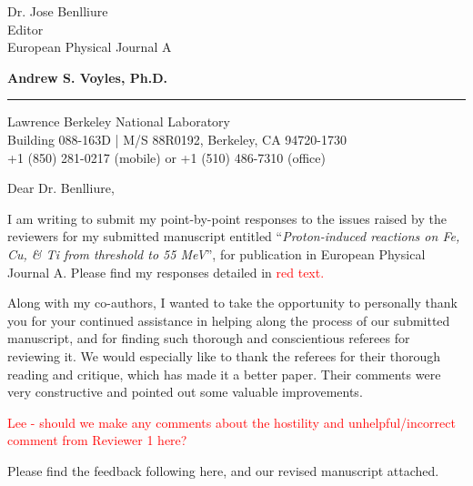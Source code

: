 \documentclass{letter} %
\newcommand{\colornote}[1]{\textcolor{red}{#1}}
\begin{document}
\signature{Andrew S. Voyles}           %
\longindentation=0pt                       %
\let\raggedleft\raggedright                %
\date{13 May, 2020}

 
 
\begin{letter}{Dr. Jose Benlliure \\
Editor \\
European Physical Journal A}


\begin{flushleft}
{\large\bf Andrew S. Voyles, Ph.D.}
\end{flushleft}
\medskip\hrule height 1pt
\begin{flushright}
\hfill Lawrence Berkeley National Laboratory \\
\hfill Building 088-163D  |  M/S 88R0192, Berkeley, CA  94720-1730 \\
\hfill  +1 (850) 281-0217 (mobile) or +1 (510) 486-7310 (office) 
\end{flushright} 
\vfill %

 
\opening{Dear Dr. Benlliure,} 

  \renewcommand*{\thefootnote}{\alph{footnote}}

  \noindent I am writing to submit my point-by-point responses to the issues raised by the reviewers for my submitted manuscript entitled \enquote{\emph{Proton-induced reactions on Fe, Cu, \& Ti from threshold to 55 MeV}},  for publication in European Physical Journal A.  Please find my responses detailed in \colornote{red text.}
  
  \noindent Along with my co-authors, I wanted to take the opportunity to personally thank you for your continued assistance in helping along the process of our submitted manuscript, and for finding such thorough and conscientious referees for reviewing it.  We would especially like to thank the referees for their thorough reading and critique, which has made it a better paper. Their comments were very constructive and pointed out some valuable improvements.
  
  
  \colornote{Lee - should we make any comments about the hostility and unhelpful/incorrect comment from Reviewer 1 here?}
  
  Please find the feedback following here, and our revised manuscript attached. 
  

\end{letter}
\end{document}

